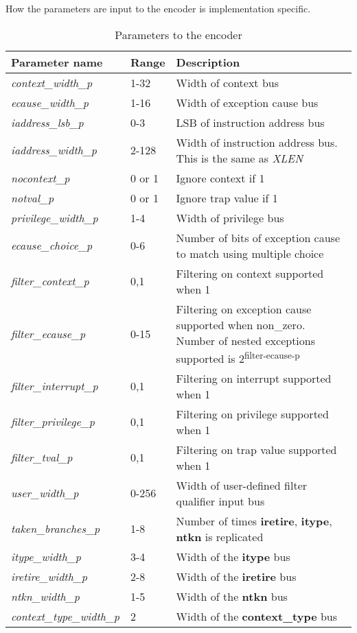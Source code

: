 How the parameters are input to the encoder is implementation specific.  
\FloatBarrier
\begin{table}[h]
    \centering
    \caption{Parameters to the encoder}
    \label{tab:parameters}
    \begin{tabulary}{\textwidth}{|l|p{25mm}|p{80mm}|}
        \hline
        \textbf {Parameter name} & \textbf {Range} & \textbf {Description} \\
        \hline
        \textit {context\_width\_p} & 1-32 & Width of context bus \\
        \hline
        \textit {ecause\_width\_p} & 1-16 & Width of exception cause bus \\
        \hline
        \textit {iaddress\_lsb\_p} & 0-3 & LSB of instruction address bus \\
        \hline
        \textit {iaddress\_width\_p} & 2-128 & Width of instruction address bus. This is the same as \textit {XLEN}\\
        \hline
        \textit {nocontext\_p} & 0 or 1 & Ignore context if 1 \\
        \hline
        \textit {notval\_p} & 0 or 1 & Ignore trap value if 1 \\
        \hline
        \textit {privilege\_width\_p} & 1-4 & Width of privilege bus \\
        \hline
        \textit {ecause\_choice\_p} & 0-6 & Number of bits of exception cause to match using multiple choice \\
        \hline
        \textit {filter\_context\_p} & 0,1 & Filtering on context supported when 1 \\
        \hline
        \textit {filter\_ecause\_p} & 0-15 & Filtering on exception cause supported when non\_zero.  Number of nested exceptions supported is 2\textsuperscript{filter-ecause-p} \\
        \hline
        \textit {filter\_interrupt\_p} & 0,1 & Filtering on interrupt supported when 1 \\
        \hline
        \textit {filter\_privilege\_p} & 0,1 & Filtering on privilege supported when 1 \\
        \hline
        \textit {filter\_tval\_p} & 0,1 & Filtering on trap value supported when 1 \\
        \hline
        \textit {user\_width\_p} & 0-256 & Width of user-defined filter qualifier input bus \\
        \hline
        \textit {taken\_branches\_p} & 1-8 & Number of times \textbf{iretire}, \textbf{itype}, \textbf{ntkn} is replicated\\
        \hline
        \textit {itype\_width\_p} & 3-4 & Width of the \textbf{itype} bus\\
        \hline
        \textit {iretire\_width\_p} & 2-8 & Width of the \textbf{iretire} bus\\
        \hline
        \textit {ntkn\_width\_p} & 1-5 & Width of the \textbf{ntkn} bus\\
        \hline
        \textit {context\_type\_width\_p} & 2 & Width of the \textbf{context\_type} bus\\
        \hline
    \end{tabulary}
\end{table}
